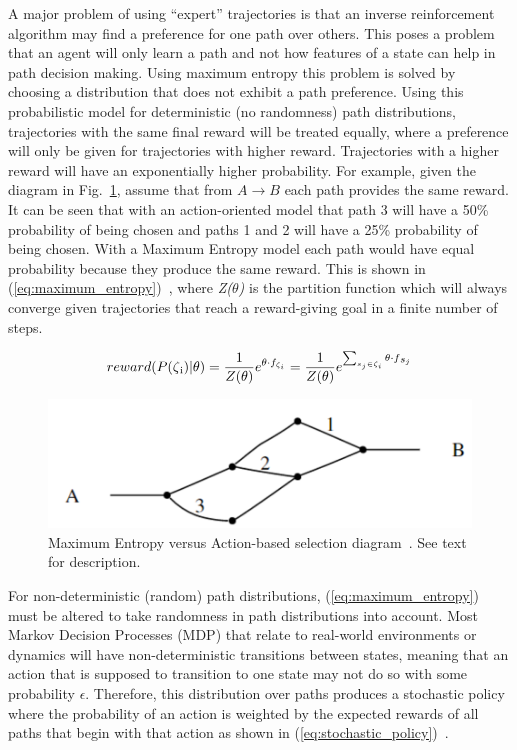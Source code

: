 \documentclass[12pt,american]{report}
\begin{document}
A major problem of using ``expert'' trajectories is that an inverse reinforcement algorithm may find a preference for one path over others.  This poses a problem that an agent will only learn a path and not how features of a state can help in path decision making.  Using maximum entropy this problem is solved by choosing a distribution that does not exhibit a path preference.  Using this probabilistic model for deterministic (no randomness) path distributions, trajectories with the same final reward will be treated equally, where a preference will only be given for trajectories with higher reward.  Trajectories with a higher reward will have an exponentially higher probability. For example, given the diagram in Fig.~\ref{fig:maxent-example}, assume that from $A \rightarrow B$ each path provides the same reward.  It can be seen that with an action-oriented model that path 3 will have a 50\% probability of being chosen and paths 1 and 2 will have a 25\% probability of being chosen.  With a Maximum Entropy model each path would have equal probability because they produce the same reward. This is shown in (\ref{eq:maximum_entropy})~\cite{ziebart2008maximum}, where \textit{Z($\theta$)} is the partition function which will always converge given trajectories that reach a reward-giving goal in a finite number of steps. 

\begin{equation}
            \label{eq:maximum_entropy}
            reward(P(\zeta\textsubscript{i})|\theta)= \frac{1}{Z(\theta)} e^{\theta \cdot f_{\zeta_i}}=  \frac{1}{Z(\theta)} e^{\sum_{s_j\in\zeta_i}^{}\theta \cdot f\textsubscript{$s_j$}}%
        \end{equation}

\begin{figure}
\centering
\includegraphics[scale=.75]{images/maxent-example.png}
\caption{Maximum Entropy versus Action-based selection diagram~\cite{ziebart2008maximum}. See text for description.}
\label{fig:maxent-example}
\end{figure}

For non-deterministic (random) path distributions, (\ref{eq:maximum_entropy}) must be altered to take randomness in path distributions into account. Most Markov Decision Processes (MDP) that relate to real-world environments or dynamics will have non-deterministic transitions between states, meaning that an action that is supposed to transition to one state may not do so with some probability $\epsilon$.  Therefore, this distribution over paths produces a stochastic policy where the probability of an action is weighted by the expected rewards of all paths that begin with that action as shown in (\ref{eq:stochastic_policy})~\cite{ziebart2008maximum}.
\end{document}
